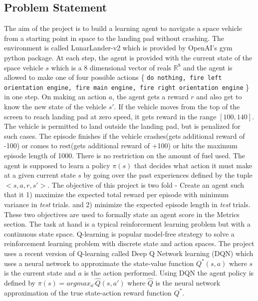 \documentclass{article}
\begin{document}
\subsection*{Problem Statement}
The aim of the project is to build a learning agent to navigate a space vehicle from a starting point in space to the landing pad without crashing. The environment is called LunarLander-v2 which is provided by OpenAI's gym python package. At each step, the agent is provided with the current state of the space vehicle $s$ which is a 8 dimensional vector of reals $\mathbb{R}^8$ and the agent is allowed to make one of four possible actions \{ \texttt{do nothing, fire left orientation engine, fire main engine, fire right orientation engine} \} in one step. On making an action $a$, the agent gets a reward $r$ and also get to know the new state of the vehicle $s'$. If the vehicle moves from the top of the screen to reach landing pad at zero speed, it gets reward in the range $[100, 140]$. The vehicle is permitted to land outside the landing pad, but is penalized for such cases. The episode finishes if the vehicle crashes(gets additional reward of -100) or comes to rest(gets additional reward of +100) or hits the maximum episode length of 1000. There is no restriction on the amount of fuel used. The agent is supposed to learn a policy $\pi(s)$ that decides what action it must make at a given current state $s$ by going over the past experiences defined by the tuple $<s, a, r, s'>$.  The objective of this project is two fold - Create an agent such that it 1) maximize the expected total reward per episode with minimum variance in \textit{test} trials. and 2) minimize the expected episode length in \textit{test} trials. These two objectives are used to formally state an agent score in the Metrics section. The task at hand is a typical reinforcement learning problem but with a continuous state space. Q-learning is popular model-free strategy to solve a reinforcement learning problem with discrete state and action spaces. The project uses a recent version of Q-learning called Deep Q Network learning (DQN)\cite{DQN} which uses a neural network to approximate the state-value function $Q^*(s,a)$ where $s$ is the current state and $a$ is the action performed. Using DQN the agent policy is defined by $\pi(s) = argmax_{a'} \hat{Q}(s,a')$ where $\hat{Q}$ is the neural network approximation of the true state-action reward function $Q^*$.
\end{document}
